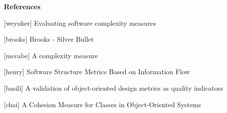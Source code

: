 \textbf{References}

[weyuker] Evaluating software complexity measures

[brooks] Brooks - Silver Bullet

[mccabe] A complexity measure

[henry] Software Structure Metrics Based on Information Flow

[basili] A validation of object-oriented design metrics as quality indicators

[chai] A Cohesion Measure for Classes in Object-Oriented Systems

